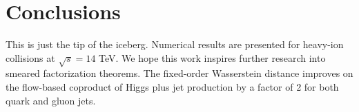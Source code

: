 \section{Conclusions}\label{sec:conclusions}

This is just the tip of the iceberg. Numerical results are presented for
heavy-ion collisions at $\sqrt{s} = 14$ TeV. We hope this work inspires
further research into smeared factorization theorems. The fixed-order
Wasserstein distance improves on the flow-based coproduct of Higgs plus
jet production by a factor of 2 for both quark and gluon jets.

